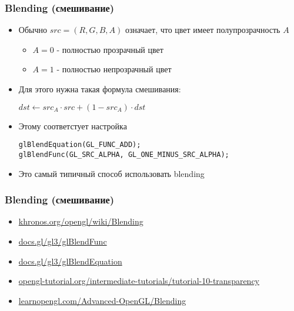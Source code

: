 \documentclass{beamer}
\begin{document}
\begin{frame}[fragile]
\frametitle{Blending (смешивание)}
\begin{itemize}
\item Обычно \begin{math}src=(R,G,B,A)\end{math} означает, что цвет имеет полупрозрачность \begin{math}A\end{math}
\begin{itemize}
\item \begin{math}A=0\end{math} - полностью прозрачный цвет
\item \begin{math}A=1\end{math} - полностью непрозрачный цвет
\end{itemize}
\pause
\item Для этого нужна такая формула смешивания:
\begin{center}
\begin{math}
dst \leftarrow src_A \cdot src + (1 - src_A) \cdot dst
\end{math}
\end{center}
\pause
\item Этому соответстует настройка
\begin{verbatim}
glBlendEquation(GL_FUNC_ADD);
glBlendFunc(GL_SRC_ALPHA, GL_ONE_MINUS_SRC_ALPHA);
\end{verbatim}
\pause
\item Это самый типичный способ использовать blending
\end{itemize}
\end{frame}

\begin{frame}[fragile]
\frametitle{Blending (смешивание)}
\begin{itemize}
\item \href{https://www.khronos.org/opengl/wiki/Blending}{khronos.org/opengl/wiki/Blending}
\item \href{http://docs.gl/gl3/glBlendFunc}{docs.gl/gl3/glBlendFunc}
\item \href{http://docs.gl/gl3/glBlendEquation}{docs.gl/gl3/glBlendEquation}
\item \href{http://www.opengl-tutorial.org/intermediate-tutorials/tutorial-10-transparency/}{opengl-tutorial.org/intermediate-tutorials/tutorial-10-transparency}
\item \href{https://learnopengl.com/Advanced-OpenGL/Blending}{learnopengl.com/Advanced-OpenGL/Blending}
\end{itemize}
\end{frame}
\end{document}
